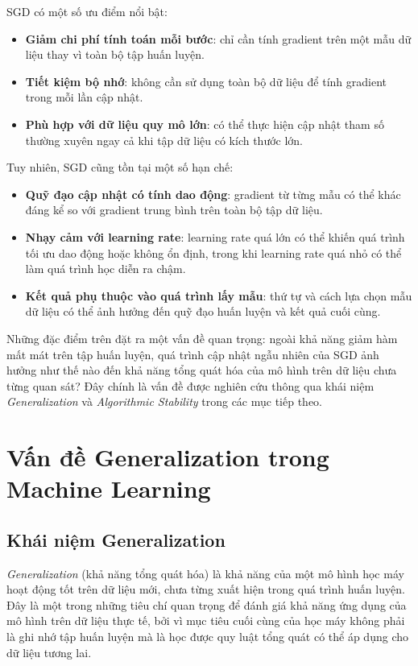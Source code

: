 SGD có một số ưu điểm nổi bật:
\begin{itemize}
    \item \textbf{Giảm chi phí tính toán mỗi bước}: chỉ cần tính gradient trên một mẫu dữ liệu thay vì toàn bộ tập huấn luyện.
    \item \textbf{Tiết kiệm bộ nhớ}: không cần sử dụng toàn bộ dữ liệu để tính gradient trong mỗi lần cập nhật.
    \item \textbf{Phù hợp với dữ liệu quy mô lớn}: có thể thực hiện cập nhật tham số thường xuyên ngay cả khi tập dữ liệu có kích thước lớn.
\end{itemize}
Tuy nhiên, SGD cũng tồn tại một số hạn chế:
\begin{itemize}
    \item \textbf{Quỹ đạo cập nhật có tính dao động}: gradient từ từng mẫu có thể khác đáng kể so với gradient trung bình trên toàn bộ tập dữ liệu.
    \item \textbf{Nhạy cảm với learning rate}: learning rate quá lớn có thể khiến quá trình tối ưu dao động hoặc không ổn định, trong khi learning rate quá nhỏ có thể làm quá trình học diễn ra chậm.
    \item \textbf{Kết quả phụ thuộc vào quá trình lấy mẫu}: thứ tự và cách lựa chọn mẫu dữ liệu có thể ảnh hưởng đến quỹ đạo huấn luyện và kết quả cuối cùng.
\end{itemize}

Những đặc điểm trên đặt ra một vấn đề quan trọng: ngoài khả năng giảm hàm mất mát trên tập huấn luyện, quá trình cập nhật ngẫu nhiên của SGD ảnh hưởng như thế nào đến khả năng tổng quát hóa của mô hình trên dữ liệu chưa từng quan sát? Đây chính là vấn đề được nghiên cứu thông qua khái niệm \textit{Generalization} và \textit{Algorithmic Stability} trong các mục tiếp theo.

\section{Vấn đề Generalization trong Machine Learning}
\label{sec:generalization}

\subsection{Khái niệm Generalization}

\textit{Generalization} (khả năng tổng quát hóa) là khả năng của một mô hình học máy hoạt động tốt trên dữ liệu mới, chưa từng xuất hiện trong quá trình huấn luyện. Đây là một trong những tiêu chí quan trọng để đánh giá khả năng ứng dụng của mô hình trên dữ liệu thực tế, bởi vì mục tiêu cuối cùng của học máy không phải là ghi nhớ tập huấn luyện mà là học được quy luật tổng quát có thể áp dụng cho dữ liệu tương lai.

